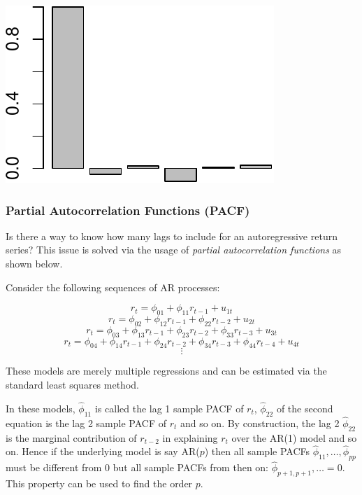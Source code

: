 \documentclass[11pt,]{article}
\newenvironment{Shaded}{\begin{snugshade}}{\end{snugshade}}
\newcommand{\KeywordTok}[1]{\textcolor[rgb]{0.13,0.29,0.53}{\textbf{#1}}}
\newcommand{\OperatorTok}[1]{\textcolor[rgb]{0.81,0.36,0.00}{\textbf{#1}}}
\newcommand{\NormalTok}[1]{#1}
\begin{document}
\begin{Shaded}
\end{Shaded}

\begin{center}\includegraphics{FMC_T4_PhD_ARMA_GARCH_files/figure-latex/sample_ACF_logret-6} \end{center}

\subsubsection{Partial Autocorrelation Functions
(PACF)}\label{partial-autocorrelation-functions-pacf}

Is there a way to know how many lags to include for an autoregressive
return series? This issue is solved via the usage of \emph{partial
autocorrelation functions} as shown below.

Consider the following sequences of AR processes:

\[r_t=\phi_{01}+ \phi_{11}r_{t-1}+u_{1t}\]
\[r_t=\phi_{02}+ \phi_{12}r_{t-1}+\phi_{22}r_{t-2}+u_{2t}\]
\[r_t=\phi_{03}+ \phi_{13}r_{t-1}+\phi_{23}r_{t-2}+\phi_{33}r_{t-3}+u_{3t}\]
\[r_t=\phi_{04}+ \phi_{14}r_{t-1}+\phi_{24}r_{t-2}+\phi_{34}r_{t-3}+\phi_{44}r_{t-4}+u_{4t}\]
\[\vdots\]

These models are merely multiple regressions and can be estimated via
the standard least squares method.

In these models, \(\hat{\phi}_{11}\) is called the lag 1 sample PACF of
\(r_t\), \(\hat{\phi}_{22}\) of the second equation is the lag 2 sample
PACF of \(r_t\) and so on. By construction, the lag 2
\(\hat{\phi}_{22}\) is the marginal contribution of \(r_{t-2}\) in
explaining \(r_t\) over the AR(1) model and so on. Hence if the
underlying model is say AR(\(p\)) then all sample PACFs
\(\hat{\phi}_{11},\hdots, \hat{\phi}_{pp}\) must be different from 0 but
all sample PACFs from then on: \(\hat{\phi}_{p+1,p+1}, \hdots=0\). This
property can be used to find the order \(p\).
\end{document}
